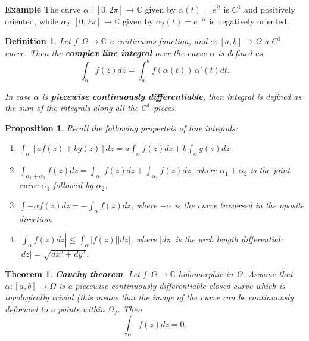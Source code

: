 \documentclass{amsart}
\newtheorem{thm}{Theorem}
\newtheorem{prop}{Proposition}
\newtheorem{mydef}{Definition}
\begin{document}
\textbf{Example} The curve \(\alpha_1: [0,2\pi] \to \mathbb{C}\) given by \(\alpha(t) = e^{it}\) is \(C^1\) and positively oriented, while \(\alpha_2: [0,2\pi] \to \mathbb{C}\) given by \(\alpha_2(t) = e^{-it}\) is negatively oriented.

\begin{mydef}
Let \(f:\Omega \to \mathbb{C}\) a continuous function, and \(\alpha : [a,b] \to \Omega\) a \(C^1\) curve. Then the \textbf{complex line integral} over the curve \(\alpha\) is defined as
\[\int_{\alpha}f(z) dz = \int_{a}^{b} f(\alpha(t)) \, \alpha'(t) dt.\]

In case \(\alpha\) is \textbf{piecewise continuously differentiable}, then integral is defined as the sum of the integrals along all the \(C^1\) pieces.
\end{mydef}

\begin{prop}
Recall the following properteis of line integrals:
\begin{enumerate}
\item \(\int_{\alpha} [ af(z) + bg(z)]dz =  a \int_{\alpha} f(z) dz + b \int_{\alpha} g(z) dz\)
\item \(\int_{\alpha_1 + \alpha_2} f(z) dz = \int_{\alpha_1} f(z)dz + \int_{\alpha_2} f(z)dz\), where \(\alpha_1 + \alpha_2\) is the joint curve \(\alpha_1\) followed by \(\alpha_2\).
\item \(\int{-\alpha} f(z) dz = - \int_{\alpha} f(z)dz\), where \(-\alpha\) is the curve traversed in the oposite direction.
\item \(|\int_{\alpha} f(z)dz | \leq \int_{\alpha} |f(z)| |dz|\), where \(|dz|\) is the arch length differential: \(|dz| = \sqrt{dx^2 + dy^2}\).
\end{enumerate}
\end{prop}


\begin{thm}
\textbf{Cauchy theorem}. Let \(f:\Omega \to \mathbb{C}\) holomorphic in \(\Omega\). Assume that \(\alpha: [a,b] \to \Omega\) is a piecewise continuously differentiable closed curve which is topologically trivial (this means that the image of the curve can be continuously deformed to a points within \(\Omega\)). Then
\[ \int_{\alpha} f(z) dz = 0. \]
\end{thm}
\end{document}
